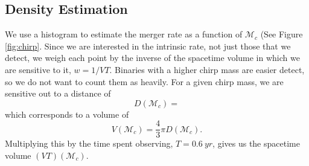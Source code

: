 \subsection{Density Estimation}

We use a histogram to estimate the merger rate as a function of $\mathcal{M}_c$ (See Figure \ref{fig:chirp}. Since we are interested in the intrinsic rate, not just those that we detect, we weigh each point by the inverse of the spacetime volume in which we are sensitive to it, $w = 1 / VT$. Binaries with a higher chirp mass are easier detect, so we do not want to count them as heavily. For a given chirp mass, we are sensitive out to a distance of
%
\begin{equation}
  D(\mathcal{M}_c) =
\end{equation}
%
which corresponds to a volume of
%
\begin{equation}
  V(\mathcal{M}_c) = \frac{4}{3} \pi D(\mathcal{M}_c).
\end{equation}
%
Multiplying this by the time spent observing, $T = \SI{0.6}{yr}$, gives us the spacetime volume $(VT)(\mathcal{M}_c)$.